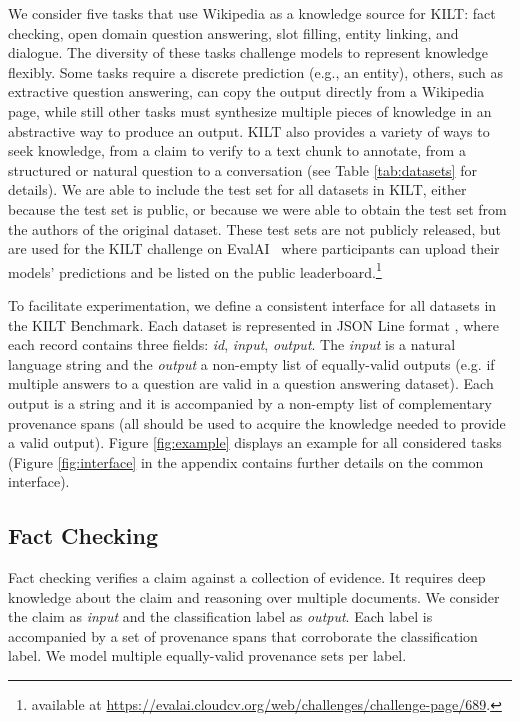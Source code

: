 \documentclass[11pt]{article}
\begin{document}
We consider five tasks that use Wikipedia as a knowledge source for KILT: fact checking, open domain question answering, slot filling, entity linking, and dialogue.  The diversity of these tasks challenge models to represent knowledge flexibly. Some tasks require a discrete prediction (e.g., an entity), others, such as extractive question answering, can copy the output directly from a Wikipedia page, while still other tasks must synthesize multiple pieces of knowledge in an abstractive way to produce an output. KILT also provides a variety of ways to seek knowledge, from a claim to verify to a text chunk to annotate, from a structured or natural question to a conversation (see Table \ref{tab:datasets} for details). 
We are able to include the test set for all datasets in KILT, either because the test set is public, or because we were able to obtain the test set from the authors of the original dataset. These test sets are not publicly released, but are used for the KILT challenge on EvalAI~\cite{EvalAI} 
where participants can upload their models' predictions and be listed on the public leaderboard.\footnote{available at \url{https://evalai.cloudcv.org/web/challenges/challenge-page/689}.}

To facilitate experimentation, we define a consistent interface for all datasets in the KILT Benchmark.
Each dataset is represented in JSON Line format
, 
where each record contains three fields: \emph{id}, \emph{input}, \emph{output}. The \emph{input} is a natural language string and the \emph{output} a non-empty list of equally-valid outputs (e.g. if multiple answers to a question are valid in a question answering dataset). Each output is a string and it is accompanied by a non-empty list of complementary provenance spans (all should be used to acquire the knowledge needed to provide a valid output).
Figure \ref{fig:example} displays an example for all considered tasks (Figure \ref{fig:interface} in the appendix contains further details on the common interface). 



\subsection{Fact Checking}

Fact checking verifies a claim against a collection of evidence. It requires deep knowledge about the claim and reasoning over multiple documents. We consider the claim as \emph{input} and the classification label as \emph{output}. Each label is accompanied by a set of provenance spans that corroborate the classification label. We model multiple equally-valid provenance sets per label.
\end{document}
